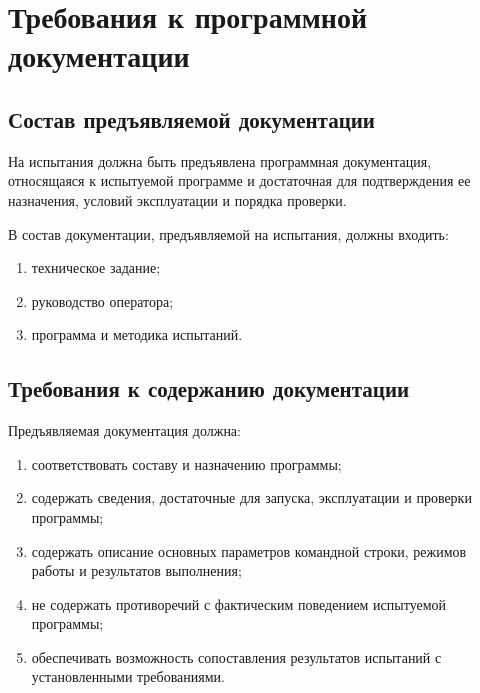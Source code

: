 \section{Требования к программной документации}

\subsection{Состав предъявляемой документации}

На испытания должна быть предъявлена программная документация, относящаяся к
испытуемой программе и достаточная для подтверждения ее назначения, условий
эксплуатации и порядка проверки.

В состав документации, предъявляемой на испытания, должны входить:
\begin{enumerate}
    \item техническое задание;
    \item руководство оператора;
    \item программа и методика испытаний.
\end{enumerate}

\subsection{Требования к содержанию документации}

Предъявляемая документация должна:
\begin{enumerate}
    \item соответствовать составу и назначению программы;
    \item содержать сведения, достаточные для запуска, эксплуатации и проверки
    программы;
    \item содержать описание основных параметров командной строки, режимов
    работы и результатов выполнения;
    \item не содержать противоречий с фактическим поведением испытуемой
    программы;
    \item обеспечивать возможность сопоставления результатов испытаний с
    установленными требованиями.
\end{enumerate}
